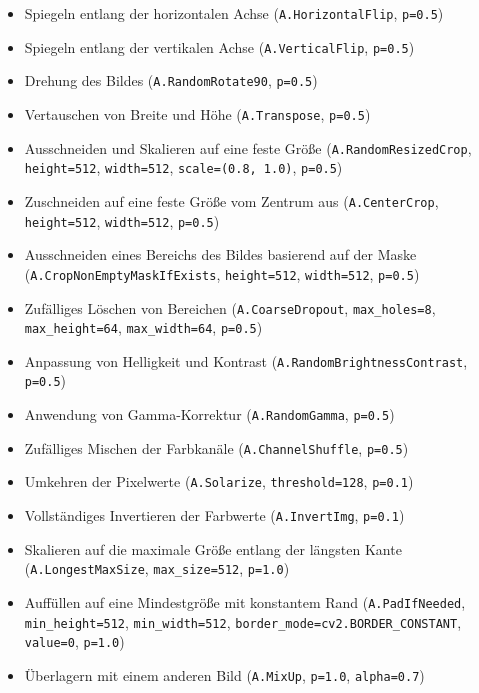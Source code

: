 \begin{itemize}[itemsep=0pt, topsep=0pt]
    \item Spiegeln entlang der horizontalen Achse (\texttt{A.HorizontalFlip}, \texttt{p=0.5})
    \item Spiegeln entlang der vertikalen Achse (\texttt{A.VerticalFlip}, \texttt{p=0.5})
    \item Drehung des Bildes (\texttt{A.RandomRotate90}, \texttt{p=0.5})
    \item Vertauschen von Breite und Höhe (\texttt{A.Transpose}, \texttt{p=0.5})
    \item Ausschneiden und Skalieren auf eine feste Größe (\texttt{A.RandomResizedCrop}, \texttt{height=512}, \texttt{width=512}, \texttt{scale=(0.8, 1.0)}, \texttt{p=0.5})
    \item Zuschneiden auf eine feste Größe vom Zentrum aus (\texttt{A.CenterCrop}, \texttt{height=512}, \texttt{width=512}, \texttt{p=0.5})
    \item Ausschneiden eines Bereichs des Bildes basierend auf der Maske (\texttt{A.CropNonEmptyMaskIfExists}, \texttt{height=512}, \texttt{width=512}, \texttt{p=0.5})
    \item Zufälliges Löschen von Bereichen (\texttt{A.CoarseDropout}, \texttt{max\_holes=8}, \texttt{max\_height=64}, \texttt{max\_width=64}, \texttt{p=0.5})
    \item Anpassung von Helligkeit und Kontrast (\texttt{A.RandomBrightnessContrast}, \texttt{p=0.5})
    \item Anwendung von Gamma-Korrektur (\texttt{A.RandomGamma}, \texttt{p=0.5})
    \item Zufälliges Mischen der Farbkanäle (\texttt{A.ChannelShuffle}, \texttt{p=0.5})
    \item Umkehren der Pixelwerte (\texttt{A.Solarize}, \texttt{threshold=128}, \texttt{p=0.1})
    \item Vollständiges Invertieren der Farbwerte (\texttt{A.InvertImg}, \texttt{p=0.1})
    \item Skalieren auf die maximale Größe entlang der längsten Kante (\texttt{A.LongestMaxSize}, \texttt{max\_size=512}, \texttt{p=1.0})
    \item Auffüllen auf eine Mindestgröße mit konstantem Rand (\texttt{A.PadIfNeeded}, \texttt{min\_height=512}, \texttt{min\_width=512}, \texttt{border\_mode=cv2.BORDER\_CONSTANT}, \texttt{value=0}, \texttt{p=1.0})
    \item Überlagern mit einem anderen Bild (\texttt{A.MixUp}, \texttt{p=1.0}, \texttt{alpha=0.7})
\end{itemize}

